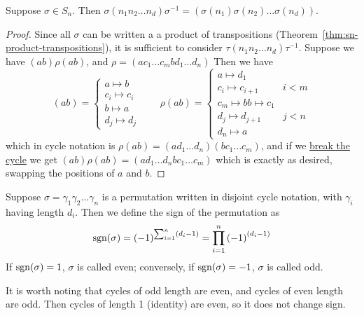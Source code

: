 \begin{proposition}\label{prop:sn-conjugation}
    Suppose \(\sigma \in S_n\).
    Then \(\sigma(n_1 n_2 \hdots n_d)\sigma^{-1}
    = (\sigma(n_1) \sigma(n_2) \hdots \sigma(n_d))\).
\end{proposition}
\begin{proof}
    Since all \(\sigma\) can be written a a product of transpositions
    (Theorem~\ref{thm:sn-product-transpositions}),
    it is sufficient to consider \(\tau(n_1 n_2 \hdots n_d)\tau^{-1}\).
    Suppose we have \((ab)\rho(ab)\),
    and \(\rho = (ac_1 \hdots c_m bd_1 \hdots d_n)\)
    Then we have
    \begin{equation*}
        (ab) = \begin{cases}
            a \mapsto b \\
            c_i \mapsto c_i \\
            b \mapsto a \\
            d_j \mapsto d_j
        \end{cases} \qquad
        \rho(ab) = \begin{cases}
            a \mapsto d_1 \\
            c_i \mapsto c_{i+1} & i < m \\
            c_m \mapsto b
            b \mapsto c_1 \\
            d_j \mapsto d_{j+1} & j < n\\
            d_n \mapsto a
        \end{cases}
    \end{equation*}
    which in cycle notation is
    \(\rho(ab) = (ad_1 \hdots d_n)(bc_1 \hdots c_m)\),
    and if we \hyperref[lem:breaking-cycles-sn]{break the cycle}
    we get \((ab)\rho(ab) = (ad_1 \hdots d_n bc_1 \hdots c_m)\)
    which is exactly as desired, swapping the positions of \(a\) and \(b\).
\end{proof}

\begin{definition}
    Suppose \(\sigma = \gamma_1\gamma_2\hdots\gamma_n\)
    is a permutation written in disjoint cycle notation,
    with \(\gamma_i\) having length \(d_i\).
    Then we define the sign of the permutation as
    \begin{equation*}
        \operatorname{sgn}(\sigma) = {(-1)}^{\sum_{i=1}^n (d_i-1)}
        = \prod_{i=1}^n {(-1)}^{(d_i-1)}
    \end{equation*}
    If \(\operatorname{sgn}(\sigma) = 1\), \(\sigma\) is called even;
    conversely, if \(\operatorname{sgn}(\sigma) = -1\), \(\sigma\) is called odd.
\end{definition}
\begin{remark}
    It is worth noting that cycles of odd length are even,
    and cycles of even length are odd.
    Then cycles of length 1 (identity) are even,
    so it does not change sign.
\end{remark}

